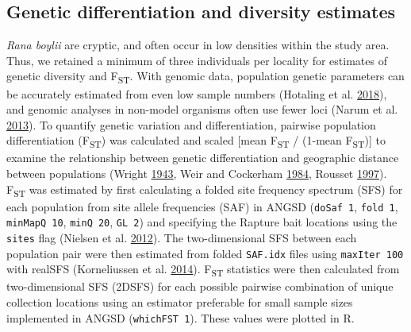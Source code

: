 \documentclass[proquest,12pt,final]{ucthesis-CA2012} %
\begin{document}
\begin{ucmainmatter}
{\subsection{Genetic differentiation and diversity
estimates}\label{genetic-differentiation-and-diversity-estimates-1}}

\emph{Rana boylii} are cryptic, and often occur in low densities within
the study area. Thus, we retained a minimum of three individuals per
locality for estimates of genetic diversity and F\textsubscript{ST}.
With genomic data, population genetic parameters can be accurately
estimated from even low sample numbers (Hotaling et al.
\protect\hyperlink{ref-hotaling_demographic_2018}{2018}), and genomic
analyses in non-model organisms often use fewer loci (Narum et al.
\protect\hyperlink{ref-narum_genotyping-by-sequencing_2013}{2013}). To
quantify genetic variation and differentiation, pairwise population
differentiation (F\textsubscript{ST}) was calculated and scaled {[}mean
F\textsubscript{ST} / (1-mean F\textsubscript{ST}){]} to examine the
relationship between genetic differentiation and geographic distance
between populations (Wright
\protect\hyperlink{ref-wright_isolation_1943}{1943}, Weir and Cockerham
\protect\hyperlink{ref-weir_estimating_1984}{1984}, Rousset
\protect\hyperlink{ref-rousset_genetic_1997}{1997}). F\textsubscript{ST}
was estimated by first calculating a folded site frequency spectrum
(SFS) for each population from site allele frequencies (SAF) in ANGSD
(\texttt{doSaf\ 1}, \texttt{fold\ 1}, \texttt{minMapQ\ 10},
\texttt{minQ\ 20}, \texttt{GL\ 2}) and specifying the Rapture bait
locations using the \texttt{sites} flag (Nielsen et al.
\protect\hyperlink{ref-nielsen_snp_2012}{2012}). The two-dimensional SFS
between each population pair were then estimated from folded
\texttt{SAF.idx} files using \texttt{maxIter\ 100} with realSFS
(Korneliussen et al.
\protect\hyperlink{ref-korneliussen_angsd_2014}{2014}).
F\textsubscript{ST} statistics were then calculated from two-dimensional
SFS (2DSFS) for each possible pairwise combination of unique collection
locations using an estimator preferable for small sample sizes
implemented in ANGSD (\texttt{whichFST\ 1}). These values were plotted
in R.


\end{ucmainmatter}
\end{document}
